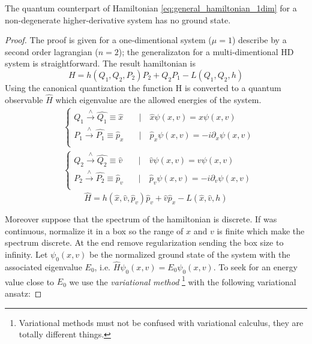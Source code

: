 \begin{theorem} \label{th:ostrogradsky_quantum}
  \cite{Smilga17} The quantum counterpart of Hamiltonian
  \eqref{eq:general_hamiltonian_1dim} for a non-degenerate higher-derivative
  system has no ground state.
\end{theorem}
\begin{proof}
  The proof is given for a one-dimentional system ($\mu=1$) describe by a second
  order lagrangian ($n=2$); the generalizaton for a multi-dimentional HD system
  is straightforward. The result hamiltonian is
  \begin{equation*}
    H = h(Q_1, Q_2, P_2) P_2 + Q_2 P_1 - L(Q_1, Q_2, h)
  \end{equation*}
  Using the canonical quantization the function H is converted to a quantum
  observable $\hat{H}$ which eigenvalue are the allowed energies of the system.
  \begin{align*}
    & \begin{cases}
      Q_1 \xrightarrow{\wedge} \hat{Q_1} \equiv \hat{x}
      \quad &\mid \quad \hat{x}\psi(x, v) = x \psi(x, v) \\
      P_1 \xrightarrow{\wedge} \hat{P_1} \equiv \hat{p}_x
      \quad &\mid \quad \hat{p}_x\psi(x, v) = -i\partial_x \psi(x, v) \\
    \end{cases} \\
    & \begin{cases}
      Q_2 \xrightarrow{\wedge} \hat{Q_2} \equiv \hat{v}
      \quad &\mid \quad \hat{v}\psi(x, v) = v \psi(x, v) \\
      P_2 \xrightarrow{\wedge} \hat{P_2} \equiv \hat{p}_v
      \quad &\mid \quad \hat{p}_v\psi(x, v) = -i\partial_v \psi(x, v) \\
    \end{cases}
  \end{align*}
  \begin{equation} \label{eq:ham_operator_2nd_order}
    \hat{H} = h(\hat{x}, \hat{v}, \hat{p}_v) \hat{p}_v + \hat{v} \hat{p}_x -
    L (\hat{x}, \hat{v}, h)
  \end{equation}

  Moreover suppose that the spectrum of the hamiltonian is discrete. If was
  continuous, normalize it in a box so the range of $x$ and $v$ is finite which
  make the spectrum discrete. At the end remove regularization sending the box
  size to infinity.
  Let $\psi_0(x, v)$ be the normalized ground state of the system with the
  associated eigenvalue $E_0$, i.e. $\hat{H}\psi_0(x, v) = E_0 \psi_0(x, v)$.
  To seek for an energy value close to $E_0$ we use the \emph{variational
  method}
  \footnote{
    Variational methods must not be confused with variational calculus, they
    are totally different things.
  } with the following variational ansatz:


\end{proof}
